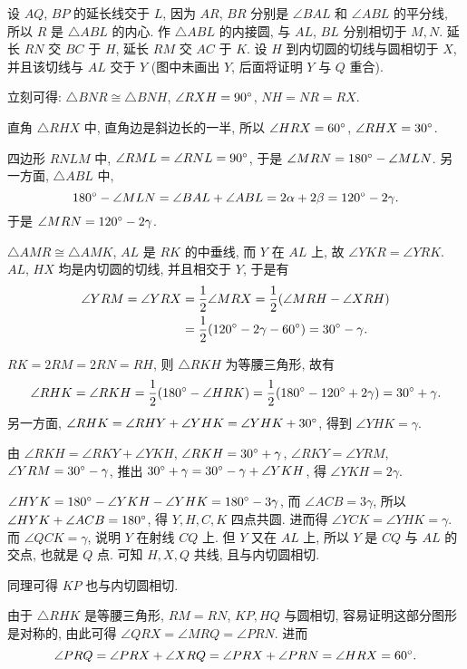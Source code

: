 设 $AQ$, $BP$ 的延长线交于 $L$, 因为 $AR$, $BR$ 分别是 $\angle BAL$ 和 $\angle ABL$ 的平分线, 所以 $R$ 是 $\triangle ABL$ 的内心. 作 $\triangle ABL$ 的内接圆, 与 $AL$, $BL$ 分别相切于 $M,N$. 延长 $RN$ 交 $BC$ 于 $H$, 延长 $RM$ 交 $AC$ 于 $K$. 设 $H$ 到内切圆的切线与圆相切于 $X$, 并且该切线与 $AL$ 交于 $Y$ (图中未画出 $Y$, 后面将证明 $Y$ 与 $Q$ 重合). 

立刻可得: $\triangle BNR \cong \triangle BNH$, $\angle RXH = 90\degree$, $NH=NR=RX$.

直角 $\triangle RHX$ 中, 直角边是斜边长的一半, 所以 $\angle HRX = 60\degree$, $\angle RHX = 30\degree$.

四边形 $RNLM$ 中, $\angle RML = \angle RNL = 90\degree$, 于是 $\angle MRN = 180\degree - \angle MLN$. 另一方面, $\triangle ABL$ 中, 
\[ 180\degree - \angle MLN = \angle BAL + \angle ABL = 2\alpha+2\beta = 120\degree - 2\gamma  .\]
于是 $\angle MRN = 120\degree - 2\gamma$.

$\triangle AMR \cong \triangle AMK$, $AL$ 是 $RK$ 的中垂线, 而 $Y$ 在 $AL$ 上, 故 $\angle YKR = \angle YRK$. $AL$, $HX$ 均是内切圆的切线, 并且相交于 $Y$, 于是有
\begin{align*}
\angle YRM = \angle YRX &= \frac{1}{2}\angle MRX = \frac{1}{2}(\angle MRH - \angle XRH) \\
 &= \frac{1}{2}(120\degree - 2\gamma - 60\degree) = 30\degree - \gamma.
\end{align*}

$RK = 2RM = 2RN = RH$, 则 $\triangle RKH$ 为等腰三角形, 故有
\[\angle RHK = \angle RKH = \frac{1}{2}(180\degree - \angle HRK) = \frac{1}{2}(180\degree - 120\degree + 2\gamma) = 30\degree + \gamma. \]
另一方面, $\angle RHK = \angle RHY + \angle YHK = \angle YHK + 30\degree$, 得到 $\angle YHK = \gamma$.

由 $\angle RKH = \angle RKY + \angle YKH$, $\angle RKH = 30\degree + \gamma$, $\angle RKY = \angle YRM$, $\angle YRM = 30\degree - \gamma$, 推出 $30\degree + \gamma = 30\degree - \gamma + \angle YKH$, 得 $\angle YKH = 2\gamma$.

$\angle HYK = 180\degree - \angle YKH - \angle YHK = 180\degree - 3\gamma$, 而 $\angle ACB = 3\gamma$, 所以 $\angle HYK + \angle ACB = 180\degree$, 得 $Y, H, C, K$ 四点共圆. 进而得 $\angle YCK = \angle YHK = \gamma$. 而 $\angle QCK = \gamma$, 说明 $Y$ 在射线 $CQ$ 上. 但 $Y$ 又在 $AL$ 上, 所以 $Y$ 是 $CQ$ 与 $AL$ 的交点, 也就是 $Q$ 点. 可知 $H,X,Q$ 共线, 且与内切圆相切.

同理可得 $KP$ 也与内切圆相切.

由于 $\triangle RHK$ 是等腰三角形, $RM = RN$, $KP,HQ$ 与圆相切, 容易证明这部分图形是对称的, 由此可得 $\angle QRX = \angle MRQ = \angle PRN$. 进而
\[\angle PRQ = \angle PRX + \angle XRQ = \angle PRX + \angle PRN = \angle HRX = 60\degree .\]

